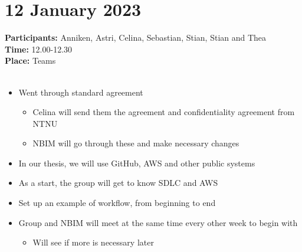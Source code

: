 \section{12 January 2023}
\textbf{Participants:} Anniken, Astri, Celina, Sebastian, Stian, Stian and Thea \\
\textbf{Time:} 12.00-12.30 \\
\textbf{Place:} Teams
\\~\\

\begin{itemize}
    \item Went through standard agreement
        \begin{itemize}
            \item Celina will send them the agreement and confidentiality agreement from NTNU
            \item NBIM will go through these and make necessary changes
        \end{itemize}
    \item In our thesis, we will use GitHub, AWS and other public systems
    \item As a start, the group will get to know SDLC and AWS
    \item Set up an example of workflow, from beginning to end
    \item Group and NBIM will meet at the same time every other week to begin with
        \begin{itemize}

            \item Will see if more is necessary later
        \end{itemize}
\end{itemize}
